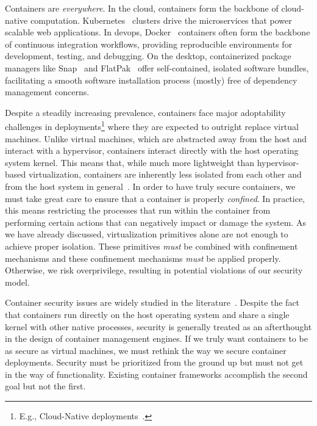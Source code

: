 \documentclass[
  fontsize=12pt,
  titlepage=firstiscover,
  paper=letter,
oneside,
  cleardoublepage=plain,
  parskip=half-,
  DIV=10,
  parindent,
  appendixprefix,
  chapterprefix,
  listof=totoc,
]{scrbook}
\begin{document}
Containers are \textit{everywhere}. In the cloud, containers form the backbone of
cloud-native computation. Kubernetes~\cite{kubernetes} clusters drive the microservices
that power scalable web applications. In devops, Docker~\cite{docker_security} containers
often form the backbone of continuous integration workflows, providing reproducible
environments for development, testing, and debugging. On the desktop, containerized
package managers like Snap~\cite{snap} and FlatPak~\cite{flatpak} offer self-contained,
isolated software bundles, facilitating a smooth software installation process (mostly)
free of dependency management concerns.

Despite a steadily increasing prevalence, containers face major adoptability challenges in
deployments\footnote{E.g., Cloud-Native deployments~\cite{brady2020_docker_cloud}.} where
they are expected to outright replace virtual machines. Unlike virtual machines, which are
abstracted away from the host and interact with a hypervisor, containers interact directly
with the host operating system kernel. This means that, while much more lightweight than
hypervisor-based virtualization, containers are inherently less isolated from each other
and from the host system in general~\cite{sultan2019_container_security,
lin2018_container_security, mullinix2020_security_measures, bui2015_docker_analysis}.  In
order to have truly secure containers, we must take great care to ensure that a container
is properly \textit{confined}. In practice, this means restricting the processes that run
within the container from performing certain actions that can negatively impact or damage
the system.  As we have already discussed, virtualization primitives alone are not enough
to achieve proper isolation. These primitives \textit{must} be combined with confinement
mechanisms and these confinement mechanisms \textit{must} be applied properly. Otherwise,
we risk overprivilege, resulting in potential violations of our security model.

Container security issues are widely studied in the
literature~\cite{sultan2019_container_security, lin2018_container_security,
mp2016_hardening, mullinix2020_security_measures, bui2015_docker_analysis}.  Despite the
fact that containers run directly on the host operating system and share a single kernel
with other native processes, security is generally treated as an afterthought in the
design of container management engines. If we truly want containers to be as secure as
virtual machines, we must rethink the way we secure container deployments. Security must
be prioritized from the ground up but must not get in the way of functionality. Existing
container frameworks accomplish the second goal but not the first.
\end{document}
